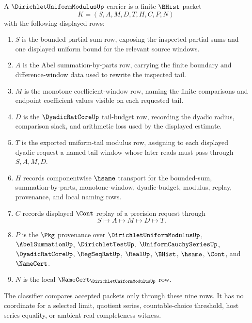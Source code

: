 \begin{definition}
\label{def:dirichlet-uniform-modulus-carrier}
A $\DirichletUniformModulusUp$ carrier is a finite $\BHist$ packet
$$
K=(S,A,M,D,T,H,C,P,N)
$$
with the following displayed rows:
\begin{enumerate}
\item $S$ is the bounded-partial-sum row, exposing the inspected partial sums and one displayed uniform bound for the relevant source windows.
\item $A$ is the Abel summation-by-parts row, carrying the finite boundary and difference-window data used to rewrite the inspected tail.
\item $M$ is the monotone coefficient-window row, naming the finite comparisons and endpoint coefficient values visible on each requested tail.
\item $D$ is the $\DyadicRatCoreUp$ tail-budget row, recording the dyadic radius, comparison slack, and arithmetic loss used by the displayed estimate.
\item $T$ is the exported uniform-tail modulus row, assigning to each displayed dyadic request a named tail window whose later reads must pass through $S,A,M,D$.
\item $H$ records componentwise $\hsame$ transport for the bounded-sum, summation-by-parts, monotone-window, dyadic-budget, modulus, replay, provenance, and local naming rows.
\item $C$ records displayed $\Cont$ replay of a precision request through
$$
S \longmapsto A \longmapsto M \longmapsto D \longmapsto T.
$$
\item $P$ is the $\Pkg$ provenance over $\DirichletUniformModulusUp$, $\AbelSummationUp$, $\DirichletTestUp$, $\UniformCauchySeriesUp$, $\DyadicRatCoreUp$, $\RegSeqRatUp$, $\RealUp$, $\BHist$, $\hsame$, $\Cont$, and $\NameCert$.
\item $N$ is the local $\NameCert_{\DirichletUniformModulusUp}$ row.
\end{enumerate}
The classifier compares accepted packets only through these nine rows. It has no coordinate for a selected limit, quotient series, countable-choice threshold, host series equality, or ambient real-completeness witness.
\end{definition}

